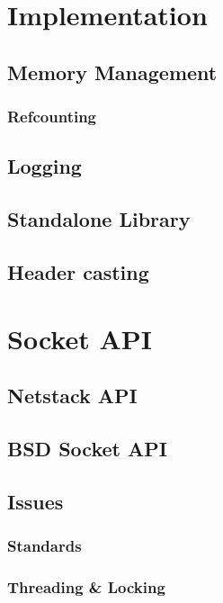 

\section{Implementation}
    
    \subsection{Memory Management}
        \subsubsection{Refcounting}

    \subsection{Logging}

    \subsection{Standalone Library}
    \subsection{Header casting}

    \section{Socket API}
        \subsection{Netstack API}
        \subsection{BSD Socket API}

    \subsection{Issues}
        \subsubsection{Standards}
        \subsubsection{Threading \& Locking}


